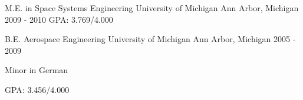 


\begin{cventries}


\cventry
{M.E. in Space Systems Engineering}
{University of Michigan}
{Ann Arbor, Michigan}
{2009 - 2010}
{GPA: 3.769/4.000}

\cventry
{B.E. Aerospace Engineering}
{University of Michigan}
{Ann Arbor, Michigan}
{2005 - 2009}
{\begin{cvitems}
\item {Minor in German}
\item {GPA: 3.456/4.000}
\end{cvitems}
}




\end{cventries}
